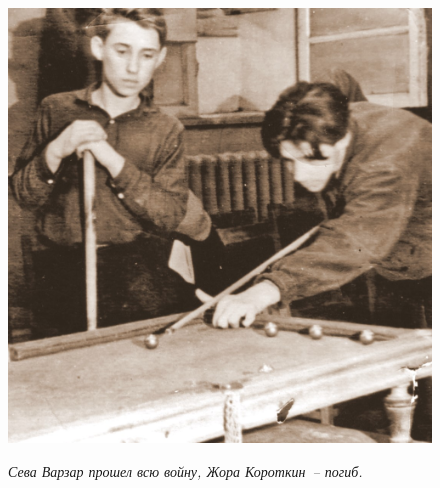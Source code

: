 \begin{figure}[h!]
\begin{minipage}[h!]{37mm}
        \includegraphics[width=\linewidth]{inc/12/6}
        
        \indent        
        
        \textit{\footnotesize{Сева Варзар прошел всю войну, Жора Короткин~-- погиб.}}
    \end{minipage}
      
      
\end{figure}

\newpage %


